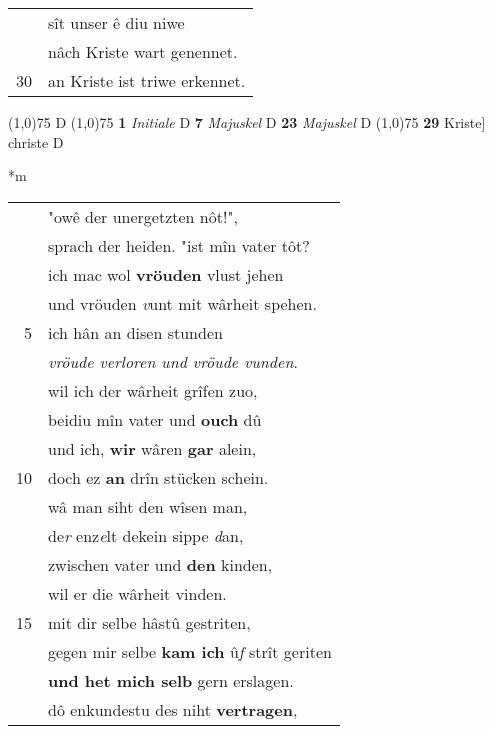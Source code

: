 \documentclass[8pt,a4paper,notitlepage]{article}
\begin{document}
\begin{table}[ht]
\begin{minipage}[t]{0.5\linewidth}
\begin{tabular}{rl}
 & sît unser ê diu niwe\\ 
 & nâch Kriste wart genennet.\\ 
30 & an Kriste ist triwe erkennet.\\ 
\end{tabular}
\scriptsize
\line(1,0){75} \newline
D \newline
\line(1,0){75} \newline
\textbf{1} \textit{Initiale} D  \textbf{7} \textit{Majuskel} D  \textbf{23} \textit{Majuskel} D  \newline
\line(1,0){75} \newline
\textbf{29} Kriste] christe D \newline
\end{minipage}
\hspace{0.5cm}
\begin{minipage}[t]{0.5\linewidth}
\small
\begin{center}*m
\end{center}
\begin{tabular}{rl}
 & "owê der unergetzten nôt!",\\ 
 & sprach der heiden. "ist mîn vater tôt?\\ 
 & ich mac wol \textbf{vröuden} vlust jehen\\ 
 & und vröuden \textit{v}unt mit wârheit spehen.\\ 
5 & ich hân an disen stunden\\ 
 & \textit{vröude verloren und vröude vunden}.\\ 
 & wil ich der wârheit grîfen zuo,\\ 
 & beidiu mîn vater und \textbf{ouch} dû\\ 
 & und ich, \textbf{wir} wâren \textbf{gar} alein,\\ 
10 & doch ez \textbf{an} drîn stücken schein.\\ 
 & wâ man siht den wîsen man,\\ 
 & de\textit{r} enz\textit{e}lt dekein sippe \textit{d}an,\\ 
 & zwischen vater und \textbf{den} kinden,\\ 
 & wil er die wârheit vinden.\\ 
15 & mit dir selbe hâstû gestriten,\\ 
 & gegen mir selbe \textbf{kam ich} û\textit{f} strît geriten\\ 
 & \textbf{und het mich selb} gern erslagen.\\ 
 & dô enkundestu des niht \textbf{vertragen},\\ 

\end{tabular}
\end{minipage}
\end{table}
\end{document}
